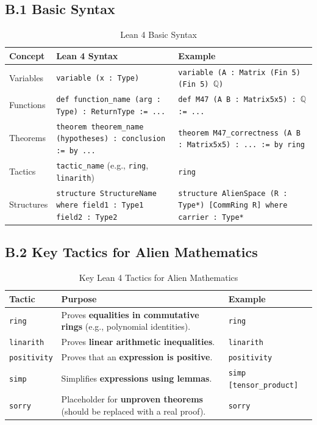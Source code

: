 \documentclass[11pt, a4paper]{article}
\begin{document}
\subsection*{B.1 Basic Syntax}
\begin{table}[h]
\centering
\caption{Lean 4 Basic Syntax}
\label{tab:lean_syntax}
\begin{tabular}{|>{\raggedright\arraybackslash}p{3cm}|>{\raggedright\arraybackslash}p{5cm}|>{\raggedright\arraybackslash}p{4cm}|}
\hline
\textbf{Concept} & \textbf{Lean 4 Syntax} & \textbf{Example} \\
\hline
Variables & \texttt{variable (x : Type)} & \texttt{variable (A : Matrix (Fin 5) (Fin 5) $\mathbb{Q}$)} \\
\hline
Functions & \texttt{def function\_name (arg : Type) : ReturnType := ...} & \texttt{def M47 (A B : Matrix5x5) : $\mathbb{Q}$ := ...} \\
\hline
Theorems & \texttt{theorem theorem\_name (hypotheses) : conclusion := by ...} & \texttt{theorem M47\_correctness (A B : Matrix5x5) : ... := by ring} \\
\hline
Tactics & \texttt{tactic\_name} (e.g., \texttt{ring}, \texttt{linarith}) & \texttt{ring} \\
\hline
Structures & \texttt{structure StructureName where field1 : Type1 field2 : Type2} & \texttt{structure AlienSpace (R : Type*) [CommRing R] where carrier : Type*} \\
\hline
\end{tabular}
\end{table}

\subsection*{B.2 Key Tactics for Alien Mathematics}
\begin{table}[h]
\centering
\caption{Key Lean 4 Tactics for Alien Mathematics}
\label{tab:lean_tactics}
\begin{tabular}{|>{\raggedright\arraybackslash}p{3cm}|>{\raggedright\arraybackslash}p{5cm}|>{\raggedright\arraybackslash}p{4cm}|}
\hline
\textbf{Tactic} & \textbf{Purpose} & \textbf{Example} \\
\hline
\texttt{ring} & Proves \textbf{equalities in commutative rings} (e.g., polynomial identities). & \texttt{ring} \\
\hline
\texttt{linarith} & Proves \textbf{linear arithmetic inequalities}. & \texttt{linarith} \\
\hline
\texttt{positivity} & Proves that an \textbf{expression is positive}. & \texttt{positivity} \\
\hline
\texttt{simp} & Simplifies \textbf{expressions using lemmas}. & \texttt{simp [tensor\_product]} \\
\hline
\texttt{sorry} & Placeholder for \textbf{unproven theorems} (should be replaced with a real proof). & \texttt{sorry} \\
\hline
\end{tabular}
\end{table}
\end{document}
